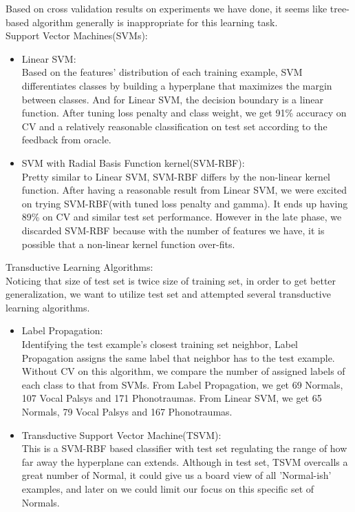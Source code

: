 Based on cross validation results on experiments we have done, it seems like tree-based algorithm generally is inappropriate for this learning task. \\

Support Vector Machines(SVMs):\\
\begin{itemize}
	\item Linear SVM:\\
	Based on the features' distribution of each training example, SVM differentiates classes by building a hyperplane that maximizes the margin between classes. And for Linear SVM, the decision boundary is a linear function. After tuning loss penalty and class weight, we get 91\% accuracy on CV and a relatively reasonable classification on test set according to the feedback from oracle.\\
	\item SVM with Radial Basis Function kernel(SVM-RBF):\\
	Pretty similar to Linear SVM, SVM-RBF differs by the non-linear kernel function. After having a reasonable result from Linear SVM, we were excited on trying SVM-RBF(with tuned loss penalty and gamma). It ends up having 89\% on CV and similar test set performance. However in the late phase, we discarded SVM-RBF because with the number of features we have, it is possible that a non-linear kernel function over-fits. \\
\end{itemize}

Transductive Learning Algorithms:\newline\\
\indent Noticing that size of test set is twice size of training set, in order to get better generalization, we want to utilize test set and attempted several transductive learning algorithms. \\
\begin{itemize}
	\item Label Propagation:\\
	Identifying the test example's closest training set neighbor, Label Propagation assigns the same label that neighbor has to the test example. Without CV on this algorithm, we compare the number of assigned labels of each class to that from SVMs. From Label Propagation, we get 69 Normals, 107 Vocal Palsys and 171 Phonotraumas. From Linear SVM, we get 65 Normals, 79 Vocal Palsys and 167 Phonotraumas.\\
	\item Transductive Support Vector Machine(TSVM):\\
	This is a SVM-RBF based classifier with test set regulating the range of how far away the hyperplane can extends. Although in test set, TSVM overcalls a great number of Normal, it could give us a board view of all 'Normal-ish' examples, and later on we could limit our focus on this specific set of Normals. \\
\end{itemize}

